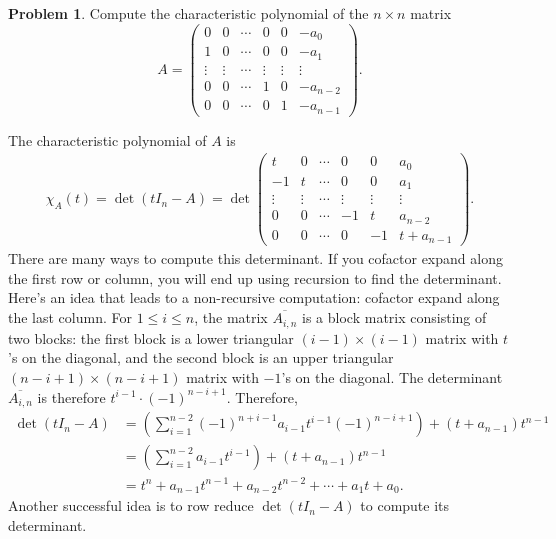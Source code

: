 \documentclass[11pt,oneside]{amsart}
\theoremstyle{definition}
\newtheorem{problem}{Problem}
\begin{document}
    \begin{problem}
        Compute the characteristic polynomial of the $n\times n$ matrix
        \[A=\begin{pmatrix}
            0&0&\cdots&0&0&-a_0\\
            1&0&\cdots&0&0&-a_1\\
            \vdots&\vdots&\cdots&\vdots&\vdots&\vdots\\
            0&0&\cdots&1&0&-a_{n-2}\\
            0&0&\cdots&0&1&-a_{n-1}
        \end{pmatrix}.\]
    \end{problem}
    \begin{solution}
        The characteristic polynomial of $A$ is
        \[\begin{split}
            \chi_A(t)=\det(tI_n-A)=\det\begin{pmatrix}
                t&0&\cdots&0&0&a_0\\
                -1&t&\cdots&0&0&a_1\\
                \vdots&\vdots&\cdots&\vdots&\vdots&\vdots\\
                0&0&\cdots&-1&t&a_{n-2}\\
                0&0&\cdots&0&-1&t+a_{n-1}
            \end{pmatrix}.
        \end{split}\]
        There are many ways to compute this determinant. If you cofactor expand along the first row or column, you will end up using recursion to find the determinant. Here's an idea that leads to a non-recursive computation: cofactor expand along the last column. For $1\leq i\leq n$, the matrix $\overline{A_{i,n}}$ is a block matrix consisting of two blocks: the first block is a lower triangular $(i-1)\times (i-1)$ matrix with $t$'s on the diagonal, and the second block is an upper triangular $(n-i+1)\times (n-i+1)$ matrix with $-1$'s on the diagonal. The determinant $\overline{A_{i,n}}$ is therefore $t^{i-1}\cdot (-1)^{n-i+1}$. Therefore,
        \[\begin{split}
            \det(tI_n-A) &= \left( \sum_{i=1}^{n-2} (-1)^{n+i-1}a_{i-1} t^{i-1}(-1)^{n-i+1} \right) + (t+a_{n-1})t^{n-1}\\
            &= \left( \sum_{i=1}^{n-2}a_{i-1}t^{i-1} \right) + (t+a_{n-1})t^{n-1}\\
            &= t^n+a_{n-1}t^{n-1}+a_{n-2}t^{n-2}+\cdots+a_1t+a_0.
        \end{split}\]
        Another successful idea is to row reduce $\det(tI_n-A)$ to compute its determinant.
    \end{solution}
\end{document}

